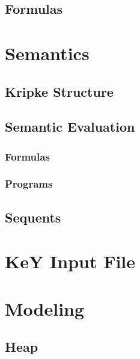 \documentclass[a4paper, 11pt, accentcolor = tud3b]{tudreport}
\begin{document}
			\subsection{Formulas} %

		\section{Semantics} %

			\subsection{Kripke Structure} %

			\subsection{Semantic Evaluation} %

				\subsubsection{Formulas} %

				\subsubsection{Programs} %

			\subsection{Sequents} %

		\section{KeY Input File} %

		\section{Modeling} %

			\subsection{Heap} %
\end{document}
